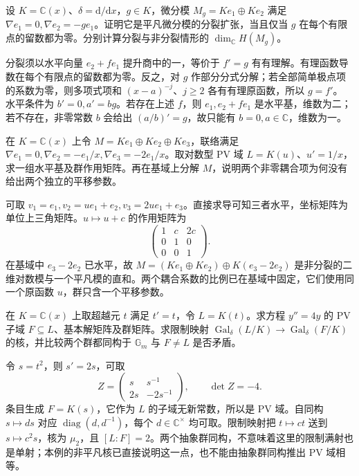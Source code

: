 \begin{exercise}
	设 \(K=\mathbb C(x)\)、\(\delta=\mathrm d/\mathrm dx\)，\(g\in K\)，微分模 \(M_g=Ke_1\oplus Ke_2\) 满足 \(\nabla e_1=0,\nabla e_2=-ge_1\)。证明它是平凡微分模的分裂扩张，当且仅当 \(g\) 在每个有限点的留数都为零。分别计算分裂与非分裂情形的 \(\dim_{\mathbb C}H(M_g)\)。
\end{exercise}
\begin{solution}
	分裂须以水平向量 \(e_2+fe_1\) 提升商中的一，等价于 \(f'=g\) 有有理解。有理函数导数在每个有限点的留数都为零。反之，对 \(g\) 作部分分式分解；若全部简单极点项的系数为零，则多项式项和 \((x-a)^{-j}\)、\(j\ge2\) 各有有理原函数，所以 \(g=f'\)。 水平条件为 \(b'=0,a'=bg\)。若存在上述 \(f\)，则 \(e_1,e_2+fe_1\) 是水平基，维数为二；若不存在，非零常数 \(b\) 会给出 \((a/b)'=g\)，故只能有 \(b=0,a\in\mathbb C\)，维数为一。
\end{solution}

\begin{exercise}
	在 \(K=\mathbb C(x)\) 上令 \(M=Ke_1\oplus Ke_2\oplus Ke_3\)，联络满足 \(\nabla e_1=0,\nabla e_2=-e_1/x,\nabla e_3=-2e_1/x\)。取对数型 PV 域 \(L=K(u)\)、\(u'=1/x\)，求一组水平基及群作用矩阵。再在基域上分解 \(M\)，说明两个非零耦合项为何没有给出两个独立的平移参数。
\end{exercise}
\begin{solution}
	可取 \(v_1=e_1,v_2=ue_1+e_2,v_3=2ue_1+e_3\)。直接求导可知三者水平，坐标矩阵为单位上三角矩阵。\(u\mapsto u+c\) 的作用矩阵为
	\[
		\begin{pmatrix}1&c&2c\\0&1&0\\0&0&1\end{pmatrix}.
	\]
	在基域中 \(e_3-2e_2\) 已水平，故 \(M=(Ke_1\oplus Ke_2)\oplus K(e_3-2e_2)\) 是非分裂的二维对数模与一个平凡模的直和。两个耦合系数的比例已在基域中固定，它们使用同一个原函数 \(u\)，群只含一个平移参数。
\end{solution}

\begin{exercise}
	在 \(K=\mathbb C(x)\) 上取超越元 \(t\) 满足 \(t'=t\)，令 \(L=K(t)\)。求方程 \(y''=4y\) 的 PV 子域 \(F\subseteq L\)、基本解矩阵及群矩阵。求限制映射 \(\operatorname{Gal}_\delta(L/K)\to\operatorname{Gal}_\delta(F/K)\) 的核，并比较两个群都同构于 \(\mathbb G_m\) 与 \(F\ne L\) 是否矛盾。
\end{exercise}
\begin{solution}
	令 \(s=t^2\)，则 \(s'=2s\)，可取
	\[
		Z=\begin{pmatrix}s&s^{-1}\\2s&-2s^{-1}\end{pmatrix},
		\qquad \det Z=-4.
	\]
	条目生成 \(F=K(s)\)，它作为 \(L\) 的子域无新常数，所以是 PV 域。自同构 \(s\mapsto ds\) 对应 \(\operatorname{diag}(d,d^{-1})\)，每个 \(d\in\mathbb C^\times\) 均可取。限制映射把 \(t\mapsto ct\) 送到 \(s\mapsto c^2s\)，核为 \(\mu_2\)，且 \([L:F]=2\)。两个抽象群同构，不意味着这里的限制满射也是单射；本例的非平凡核已直接说明这一点，也不能由抽象群同构推出 PV 域相等。
\end{solution}

